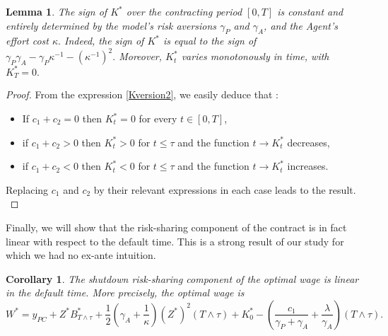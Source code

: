 \documentclass[numbook, envcountsect, envcountsame, envcountreset, runningheads, smallextended]{article}
\newtheorem{Lemma}{Lemma}[part]
\newtheorem{Corollary}{Corollary}[part]
\begin{document}
\begin{Lemma}
\label{lemma:signK}The sign of $K^*$ over the contracting period $[0,T]$ is constant and entirely determined by the model's risk aversions $\gamma_P$ and $\gamma_A$, and the Agent's effort cost $\kappa.$ Indeed, 
the sign of $K^*$ is equal to the sign of  $\gamma_P \gamma_A - \gamma_P \kappa^{-1} - (\kappa^{-1})^2.$  
Moreover, $K^*_t$ varies monotonously in time, with $K^*_T = 0.$
\end{Lemma}
\begin{proof}
From the expression \eqref{Kversion2}, we easily deduce that :
\begin{itemize}
\item If $c_1+c_2=0$ then $K^*_t=0$ for every $t \in [0,T]$,
\item if $c_1+c_2>0$ then $K^*_t >0$ for $t \le \tau$ and the function $t \to K^*_t$ decreases,
\item if $c_1+c_2<0$ then $K^*_t <0$ for $t \le \tau$ and the function $t \to K^*_t$ increases.
\end{itemize}
Replacing $c_1$ and $c_2$ by their relevant expressions in each case leads to the result. \\
\end{proof}
Finally, we will show that the risk-sharing component of the contract is in fact linear with respect to the default time. This is a strong result of our study for which we had no ex-ante intuition.
\begin{Corollary}
The shutdown risk-sharing component of the optimal wage is linear in the default time. More precisely, the optimal wage is
$$
W^*=y_{PC}+Z^*B^*_{T\wedge \tau}+\frac{1}{2}\left(\gamma_A+\frac{1}{\kappa}\right)(Z^*)^2 (T\wedge \tau ) +K^*_0  -\left( \frac{c_1}{\gamma_P + \gamma_A} + \frac{\lambda}{\gamma_A}\right)(T \wedge \tau).
$$
\end{Corollary}
\end{document}
